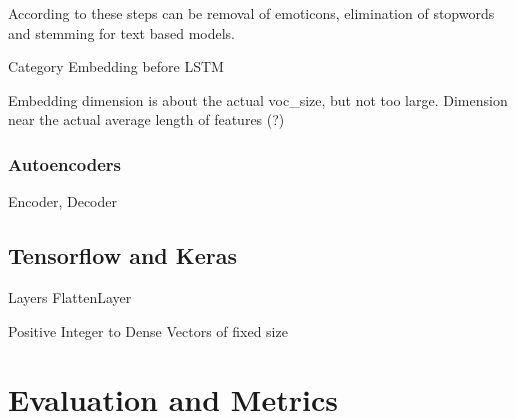 According to \cite{alam2019impact} these steps can be removal of emoticons, elimination of stopwords and stemming for text based models.

Category Embedding before LSTM


Embedding dimension is about the actual voc\_size, but not too large.
Dimension near the actual average length of features (?)

\subsubsection{Autoencoders}
\label{subsubsec:autoencoder}

Encoder, Decoder

\subsection{Tensorflow and Keras}
Layers
FlattenLayer

Positive Integer to Dense Vectors of fixed size

\section{Evaluation and Metrics}

